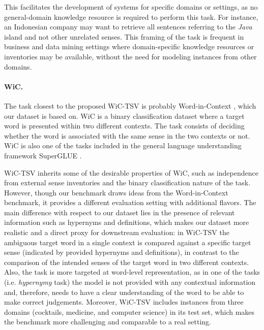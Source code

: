 \documentclass[11pt,a4paper]{article}
\begin{document}
This facilitates the development of systems for specific domains or settings, as no general-domain knowledge resource is required to perform this task. 
For instance, an Indonesian company may want to retrieve all sentences referring to the \textit{Java} island and not other unrelated senses. This framing of the task is frequent in business and data mining settings where domain-specific knowledge resources or inventories may be available, without the need for modeling instances from other domains.





\paragraph{WiC.}
The task closest to the proposed WiC-TSV is probably Word-in-Context \cite[WiC]{pilehvar-camacho-collados-2019-wic}, which our dataset is based on. WiC is a binary classification dataset where a target word is presented within two different contexts. The task consists of deciding whether the word is associated with the same sense in the two contexts or not. 
WiC is also one of the tasks included in the general language understanding framework SuperGLUE \cite{wang2019superglue}. 

WiC-TSV inherits some of the desirable properties of WiC, such as independence from external sense inventories and the binary classification nature of the task.
However, though our benchmark draws ideas from the Word-in-Context benchmark, 
it provides a different evaluation setting with additional flavors. 
The main difference with respect to our dataset lies in the presence of relevant information such as hypernyms and definitions, which makes our dataset more realistic and a direct proxy for downstream evaluation: in WiC-TSV the ambiguous target word in a single context is compared against a specific target sense (indicated by provided hypernyms and definitions), in contrast to the comparison of the intended senses of the target word in two different contexts.
Also, the task is more targeted at word-level representation, as in one of the tasks (i.e. {\it hypernymy} task) the model is not provided with any contextual information and, therefore, needs to have a clear understanding of the word to be able to make correct judgements.
Moreover, WiC-TSV includes instances from three domains (cocktails, medicine, and computer science) in its test set, which makes the benchmark more challenging and comparable to a real setting.
\end{document}
